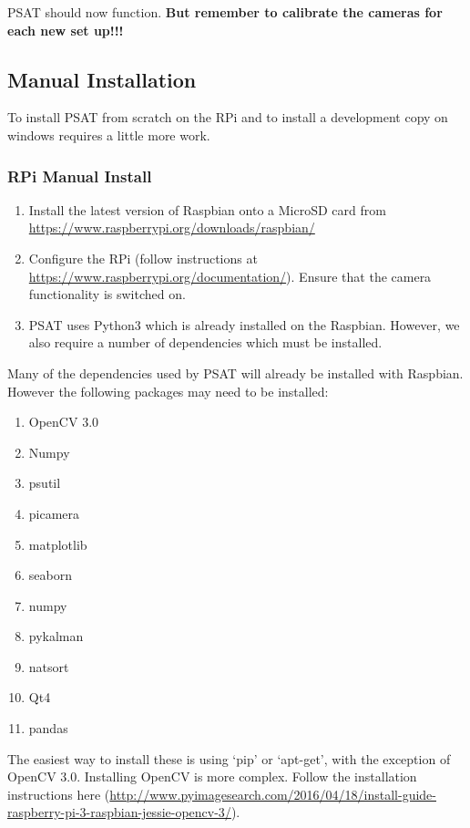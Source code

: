 \documentclass[12pt,a4paper]{report}
\begin{document}
		 PSAT should now function. \textbf{But remember to calibrate the cameras for each new set up!!!}
		 
		 
		\subsection{Manual Installation}
		To install PSAT from scratch on the RPi and to install a development copy on windows requires a little more work. 
		
		\subsubsection{RPi Manual Install}
		
		\begin{enumerate}
			\item Install the latest version of Raspbian onto a MicroSD card from \url{https://www.raspberrypi.org/downloads/raspbian/}
			\item Configure the RPi (follow instructions at \url{https://www.raspberrypi.org/documentation/}). Ensure that the camera functionality is switched on.
			\item PSAT uses Python3 which is already installed on the Raspbian. However, we also require a number of dependencies which must be installed.			
		\end{enumerate}
	
		Many of the dependencies used by PSAT will already be installed with Raspbian. However the following packages may need to be installed:
	
		\begin{enumerate}
			\item OpenCV 3.0
			\item Numpy
			\item psutil
			\item picamera
			\item matplotlib
			\item seaborn 
			\item numpy 
			\item pykalman
			\item natsort
			\item Qt4
			\item pandas				
		\end{enumerate}
	
		The easiest way to install these is using `pip' or `apt-get', with the exception of OpenCV 3.0. Installing OpenCV is more complex. Follow the installation instructions here (\url{http://www.pyimagesearch.com/2016/04/18/install-guide-raspberry-pi-3-raspbian-jessie-opencv-3/}). 
				
\end{document}

